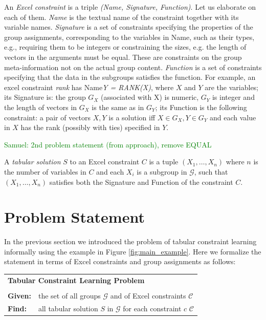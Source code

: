 \documentclass{ecai}
\newcommand{\samuel}[1]{\textcolor{green}{{\sc Samuel:} #1}\xspace}
\newcommand{\constraints}{\ensuremath{\mathcal{C}}\xspace}
\newcommand{\CName}{Name\xspace}
\newcommand{\CSignature}{Signature\xspace}
\newcommand{\CFunction}{Function\xspace}
\newcommand{\groups}{\ensuremath{\mathcal{G}}\xspace}
\begin{document}
An \textit{Excel constraint} is a triple \textit{(\CName, \CSignature, \CFunction)}. Let us elaborate on each of them. \textit{\CName} is the textual name of the constraint together with its variable names. \textit{\CSignature} is a set of constraints specifying the properties of the group assignments, corresponding to the variables in \CName, such as their types, e.g., requiring them to be integers or constraining the sizes, e.g. the length of vectors in the arguments must be equal. These are constraints on the group meta-information not on the actual group content. \textit{\CFunction} is a set of constraints specifying that the data in the subgroups satisfies the function. For example, an excel constraint \textit{rank} has \CName \textit{Y = RANK(X)}, where $X$ and $Y$ are the variables; its \CSignature is: the group $G_X$ (associated with X) is numeric, $G_Y$ is integer and the length of vectors in $G_X$ is the same as in $G_Y$; its \CFunction is the following constraint: a pair of vectors $X,Y$ is a solution iff $X \in G_X, Y \in G_Y$ and each value in $X$ has the rank (possibly with ties) specified in $Y$.

\samuel{2nd problem statement (from approach), remove EQUAL}

A \textit{tabular solution} $S$ to an Excel constraint $C$ is a tuple $(X_1, \dots, X_n)$ where $n$ is the number of variables in $C$ and each $X_i$ is a subgroup in \groups, such that $(X_1,\dots,X_n)$ satisfies both the \CSignature and \CFunction of the constraint $C$.

\section{Problem Statement}
In the previous section we introduced the problem of tabular constraint learning informally using the example in Figure \ref{fig:main_example}. Here we formalize the statement in terms of Excel constraints and group assignments as follows: 

\begin{minipage}[c]{14em}
  \vspace{5pt}
  \begin{tabular}{ll}
    \multicolumn{2}{l}{{\textbf{Tabular Constraint Learning Problem}}}\\
    \vspace{-4pt}
    &\\
    \textbf{Given:}& the set of all groups $\groups$ and of Excel constraints $\constraints$\\
    \textbf{Find:}&  all tabular solution $S$ in \groups for each constraint $c$ \constraints \\ 
  \end{tabular}
  \vspace{6pt}
\end{minipage}
\end{document}
